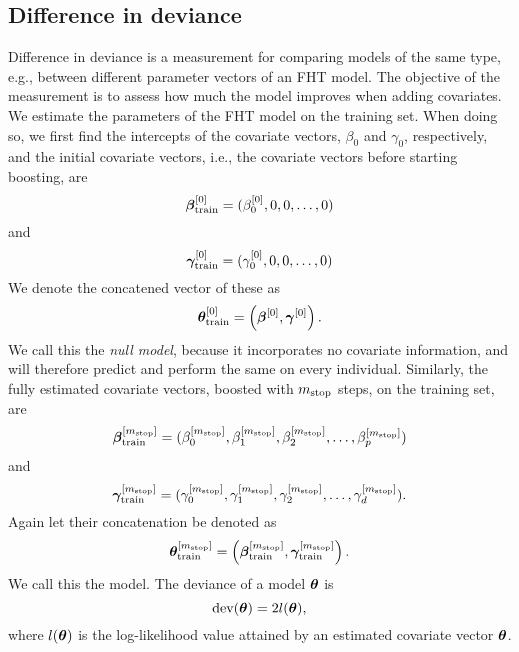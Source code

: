 \subsection{Difference in deviance}
Difference in deviance is a measurement for comparing models of the same type, e.g., between different parameter vectors of an FHT model.
The objective of the measurement is to assess how much the model improves when adding covariates.
We estimate the parameters of the FHT model on the training set.
When doing so, we first find the intercepts of the covariate vectors, $\beta_0$ and $\gamma_0$, respectively,
and the initial covariate vectors, i.e., the covariate vectors before starting boosting, are
\begin{equation*}
    \boldsymbol{\beta}^{[0]}_{\text{train}}=(\beta_0^{[0]},0,0,\ldots,0)
\end{equation*}
and
\begin{equation*}
    \boldsymbol{\gamma}^{[0]}_{\text{train}}=(\gamma_0^{[0]},0,0,\ldots,0)
\end{equation*}
We denote the concatened vector of these as
\begin{equation*}
    \boldsymbol{\theta}^{[0]}_{\text{train}}=\left(\boldsymbol{\beta}^{[0]},\boldsymbol{\gamma}^{[0]}\right).
\end{equation*}
We call this the \textit{null model}, because it incorporates no covariate information, and will therefore predict and perform the same on every individual.
Similarly, the fully estimated covariate vectors, boosted with $m_{\text{stop}}$ steps, on the training set, are
\begin{equation*}
    \boldsymbol{\beta}^{[m_{\text{stop}}]}_{\text{train}}=(\beta_0^{[m_{\text{stop}}]},\beta_1^{[m_{\text{stop}}]},\beta_2^{[m_{\text{stop}}]},\ldots,\beta_p^{[m_{\text{stop}}]})
\end{equation*}
and
\begin{equation*}
    \boldsymbol{\gamma}^{[m_{\text{stop}}]}_{\text{train}}=(\gamma_0^{[m_{\text{stop}}]},\gamma_1^{[m_{\text{stop}}]},\gamma_2^{[m_{\text{stop}}]},\ldots,\gamma_d^{[m_{\text{stop}}]}).
\end{equation*}
Again let their concatenation be denoted as
\begin{equation*}
    \boldsymbol{\theta}^{[m_{\text{stop}}]}_{\text{train}}=\left(\boldsymbol{\beta}^{[m_{\text{stop}}]}_{\text{train}},\boldsymbol{\gamma}^{[m_{\text{stop}}]}_{\text{train}}\right).
\end{equation*}
We call this the model.
The deviance of a model $\boldsymbol{\theta}$ is
\begin{equation}
    \text{dev}(\boldsymbol{\theta})=2l(\boldsymbol{\theta}),
\end{equation}
where $l(\boldsymbol{\theta})$ is the log-likelihood value attained by an estimated covariate vector $\boldsymbol{\theta}$.
